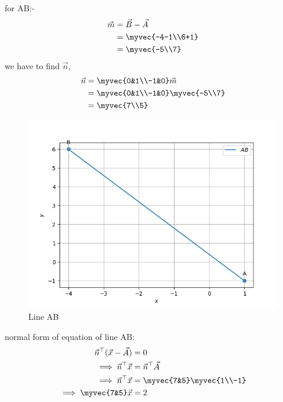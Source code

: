 for AB:-
\begin{align}
	\vec{m} &= \vec{B}-\vec{A}\\
         &= \myvec{-4-1\\6+1}\\
         &= \myvec{-5\\7}
\end{align}
we have to find $\vec{n}$,
\begin{align}
        \vec{n} &= \myvec{0&1\\-1&0}\vec{m}\\
                &= \myvec{0&1\\-1&0}\myvec{-5\\7}\\
                &= \myvec{7\\5}
\end{align}
\begin{figure}
\centering
\includegraphics[width=\columnwidth]{solutions/1/1/5a/figs/figure1.png}
\caption{Line AB}
\label{fig:line AB}	
\end{figure}
normal form of equation of line AB:
\begin{align}
                \vec{n}^{\top}(\vec{x} - \vec{A}) &= 0\\     
       \implies \vec{n}^{\top}\vec{x} &= \vec{n}^{\top}\vec{A}\\ 
       \implies \vec{n}^{\top}\vec{x} &= \myvec{7&5}\myvec{1\\-1}\\    
       \implies\myvec{7&5}\vec{x} &= 2
\end{align}
